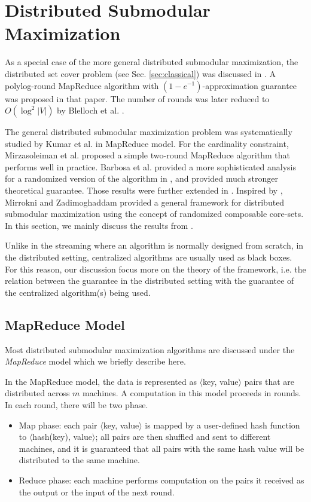 \section{Distributed Submodular Maximization}
\label{sec:distributed}
As a special case of the more general distributed submodular maximization, the distributed set cover problem (see Sec. \ref{sec:classical}) was discussed in \cite{CKT10}. A polylog-round MapReduce algorithm with $(1-e^{-1})$-approximation guarantee was proposed in that paper. The number of rounds was later reduced to $O(\log^2 |V|)$  by Blelloch et al. \cite{BST12}. 

  The general distributed submodular maximization problem was systematically studied by Kumar et al. \cite{KMV+15} in MapReduce model.  For the cardinality constraint, Mirzasoleiman et al. \cite{MKS+13} proposed a simple two-round MapReduce algorithm that performs well in practice. Barbosa et al. \cite{DEN+15} provided a more sophisticated analysis for a randomized version of the  algorithm in \cite{MKS+13}, and provided much stronger theoretical guarantee. Those results were further extended in \cite{BAN+2015new}. Inspired by \cite{MKS+13}, Mirrokni and Zadimoghaddam \cite{MZ15} provided a general framework for distributed submodular maximization using the concept of randomized composable core-sets. In this section, we mainly discuss the results from \cite{KMV+15,MKS+13,DEN+15,BAN+2015new,MZ15}.

Unlike in the streaming  where an algorithm is normally designed from scratch, in the distributed setting, centralized algorithms are usually used as black boxes. For this reason, our discussion focus more on the theory of the framework, i.e. the relation between the guarantee in the distributed setting with the guarantee of the centralized algorithm(s) being used.


\subsection{MapReduce Model}
Most distributed submodular maximization algorithms are discussed under the \emph{MapReduce} model \cite{DG08} which we briefly describe here.

In the MapReduce model, the data is represented as $\langle$key, value$\rangle$ pairs that are distributed across $m$ machines. A computation in this model proceeds in rounds. In each round, there will be two phase.
\begin{itemize}
\item Map phase: each pair $\langle$key, value$\rangle$ is mapped by a user-defined hash function to $\langle$hash(key), value$\rangle$; all pairs are then shuffled and sent to different machines, and it is guaranteed that all pairs with the same hash value  will be distributed to the same machine.
\item Reduce phase: each machine performs computation on the pairs it received as the output or the input of the next round.
\end{itemize}

